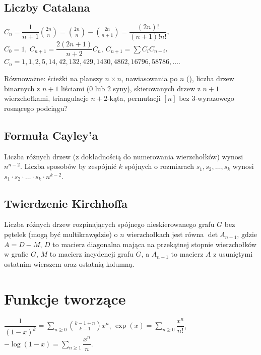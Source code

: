 	\subsection{Liczby Catalana}
		$ C_n=\dfrac{1}{n+1}\binom{2n}{n}= \binom{2n}{n}-\binom{2n}{n+1} = \dfrac{(2n)!}{(n+1)!n!} $,
		$ C_0=1,\ C_{n+1} = \dfrac{2(2n+1)}{n+2}C_n,\ C_{n+1}=\sum C_iC_{n-i} $,
		$C_n = 1, 1, 2, 5, 14, 42, 132, 429, 1430, 4862, 16796, 58786, \dots$.

		Równoważne:
			ścieżki na planszy $n\times n$,
			nawiasowania po $n$ (),
			liczba drzew binarnych z $n+1$ liściami (0 lub 2 syny),
			skierowanych drzew z $n+1$ wierzchołkami,
			triangulacje $n+2$-kąta,
			permutacji $[n]$ bez 3-wyrazowego rosnącego podciągu?

	\subsection{Formuła Cayley'a}
		Liczba różnych drzew (z dokładnością do numerowania wierzchołków) wynosi $n^{n-2}$.
		Liczba sposobów by zespójnić $k$ spójnych o rozmiarach $s_1, s_2, \dots, s_k$ wynosi $s_1 \cdot s_2 \cdot \dots \cdot s_k \cdot n^{k-2}$.

	\subsection{Twierdzenie Kirchhoffa}
		Liczba różnych drzew rozpinających spójnego nieskierowanego grafu $G$ bez pętelek (mogą być multikrawędzie) o $n$ wierzchołkach jest równa $\det A_{n-1}$, gdzie $A = D - M$, $D$ to macierz diagonalna mająca na przekątnej stopnie wierzchołków w grafie $G$, $M$ to macierz incydencji grafu $G$, a $A_{n-1}$ to macierz $A$ z usuniętymi ostatnim wierszem oraz ostatnią kolumną.

		\vspace{2em}

\section{Funkcje tworzące}
		$ \dfrac{1}{\left(1-x\right)^k} = \sum_{n\geq 0} \binom{k - 1 + n}{k - 1} x ^ n $,
		$ \exp(x) = \sum_{n\geq 0} \dfrac{x^n}{n!} $,
		$ -\log(1 - x) = \sum_{n\geq 1} \dfrac{x^n}{n} $.


